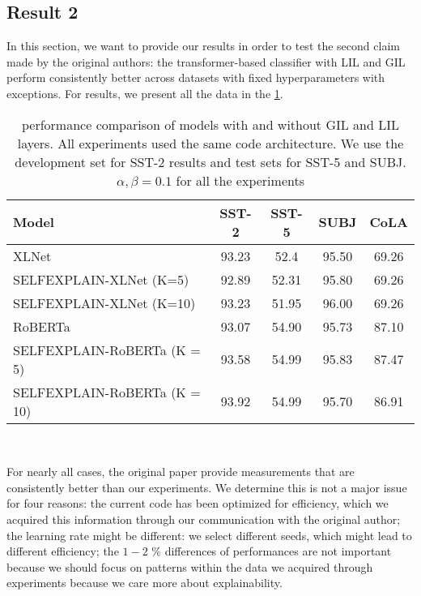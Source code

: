 \documentclass{article}
\begin{document}
\subsection{Result 2}

In this section, we want to provide our results in order to test the second claim made by 
the original authors: the transformer-based classifier with LIL and GIL perform consistently better 
across datasets with fixed hyperparameters with exceptions. 
For results, we present all the data in the \ref{table:2}. 

\begin{table}[h!]
  \centering
  \begin{tabular}{||l c c c c ||} 
   \hline
   Model & SST-2 & SST-5 & SUBJ & CoLA  \\ [0.5ex] 
   \hline\hline
   XLNet                       & 93.23 & 52.4  & 95.50 & 69.26 \\
   SELFEXPLAIN-XLNet (K=5)     & 92.89 & 52.31 & 95.80 & 69.26 \\ 
   SELFEXPLAIN-XLNet (K=10)    & 93.23 & 51.95 & 96.00 & 69.26 \\ [0.5ex]
   \hline\hline
   RoBERTa                     & 93.07 & 54.90 & 95.73 & 87.10  \\
   SELFEXPLAIN-RoBERTa (K = 5) & 93.58 & 54.99 & 95.83 & 87.47 \\ 
   SELFEXPLAIN-RoBERTa (K = 10)& 93.92 & 54.99 &  95.70 & 86.91 \\ [0.5ex]
   \hline
  \end{tabular} \\ [1ex]
  \caption{performance comparison of models with and without GIL and LIL layers. All 
  experiments used the same code architecture. We use the development set for SST-2 
  results and test sets for SST-5 and SUBJ. $\alpha, \beta = 0.1$ for all the experiments}
  \label{table:2}
\end{table}

For nearly all cases, the original paper provide measurements that are consistently better 
than our experiments. We determine this is not a major issue for four reasons: the current 
code has been optimized for efficiency, which we acquired this information through our 
communication with the original author; the learning rate might be different:
we select different seeds, which might lead to different efficiency;
the $1-2$ \% differences of performances are not important because 
we should focus on patterns within the data we acquired through experiments because we care more 
about explainability.
\end{document}
